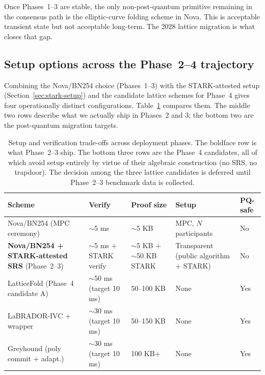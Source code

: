 \documentclass[11pt,a4paper]{article}
\begin{document}
Once Phases~1--3 are stable, the only non-post-quantum primitive remaining
in the consensus path is the elliptic-curve folding scheme in Nova.
This is acceptable transient state but not acceptable long-term. The
2028 lattice migration is what closes that gap.

\subsection{Setup options across the Phase~2--4 trajectory}

Combining the Nova/BN254 choice (Phases~1--3) with the STARK-attested setup
(Section~\ref{sec:stark-setup}) and the candidate lattice schemes for Phase~4
gives four operationally distinct configurations. Table~\ref{tab:setup-options}
compares them. The middle two rows describe what we actually ship in
Phases~2 and 3; the bottom two are the post-quantum migration targets.

\begin{table}[h]
\centering
\small
\begin{tabularx}{\linewidth}{l X X X X}
\toprule
\textbf{Scheme} & \textbf{Verify} & \textbf{Proof size} & \textbf{Setup} & \textbf{PQ-safe} \\
\midrule
Nova/BN254 (MPC ceremony)         & $\sim$5 ms                  & $\sim$5 KB              & MPC, $N$ participants                       & No \\
\textbf{Nova/BN254 + STARK-attested SRS} (Phase~2--3)
                                  & $\sim$5 ms + STARK verify   & $\sim$5 KB + $\sim$50 KB STARK
                                                                                          & Transparent (public algorithm + STARK)
                                                                                                                                        & No \\
LatticeFold (Phase~4 candidate A) & $\sim$50 ms (target 10 ms)  & 50--100 KB              & None                                         & Yes \\
LaBRADOR-IVC + wrapper            & $\sim$30 ms (target 10 ms)  & 50--150 KB              & None                                         & Yes \\
Greyhound (poly commit + adapt.)  & $\sim$30 ms (target 10 ms)  & 100 KB+                 & None                                         & Yes \\
\bottomrule
\end{tabularx}
\caption{Setup and verification trade-offs across deployment phases.
The boldface row is what Phase~2--3 ship. The bottom three rows are the
Phase~4 candidates, all of which avoid setup entirely by virtue of their
algebraic construction (no SRS, no trapdoor). The decision among the
three lattice candidates is deferred until Phase~2--3 benchmark data
is collected.}
\label{tab:setup-options}
\end{table}
\end{document}

